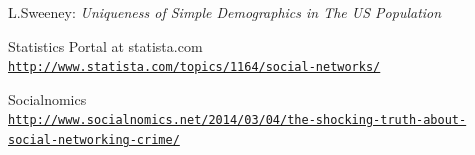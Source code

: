 \documentclass[conference]{IEEEtran}
\begin{document}
\begin{thebibliography}{1}
L.Sweeney: 
\textit{Uniqueness of Simple Demographics in The US Population}

Statistics Portal at statista.com
\\\texttt{\url{http://www.statista.com/topics/1164/social-networks/}}

Socialnomics
\\\texttt{\url{http://www.socialnomics.net/2014/03/04/the-shocking-truth-about-social-networking-crime/}}




%
%


%


\end{thebibliography}
\end{document}

